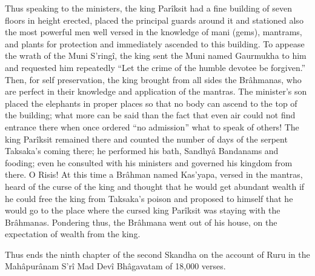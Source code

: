 Thus speaking to the ministers, the king Parîksit had a fine building of seven floors in height erected, placed the principal guards around it and stationed also the most powerful men well versed in the knowledge of mani (gems), mantrams, and plants for protection and immediately ascended to this building. To appease the wrath of the Muni S’ringî, the king sent the Muni named Gaurmukha to him and requested him repeatedly “Let the crime of the humble devotee be forgiven.” Then, for self preservation, the king brought from all sides the Brâhmanas, who are perfect in their knowledge and application of the mantras. The minister's son placed the elephants in proper places so that no body can ascend to the top of the building; what more can be said than the fact that even air could not find entrance there when once ordered “no admission” what to speak of others! The king Parîksit remained there and counted the number of days of the serpent Taksaka's coming there; he performed his bath, Sandhyâ Bandanams and fooding; even he consulted with his ministers and governed his kingdom from there. O Risis! At this time a Brâhman named Kas'yapa, versed in the mantras, heard of the curse of the king and thought that he would get abundant wealth if he could free the king from Taksaka's poison and proposed to himself that he would go to the place where the cursed king Parîksit was staying with the Brâhmanas. Pondering thus, the Brâhmana went out of his house, on the expectation of wealth from the king.

 

Thus ends the ninth chapter of the second Skandha on the account of Ruru in the Mahâpurânam S’rî Mad Devî Bhâgavatam of 18,000 verses.

